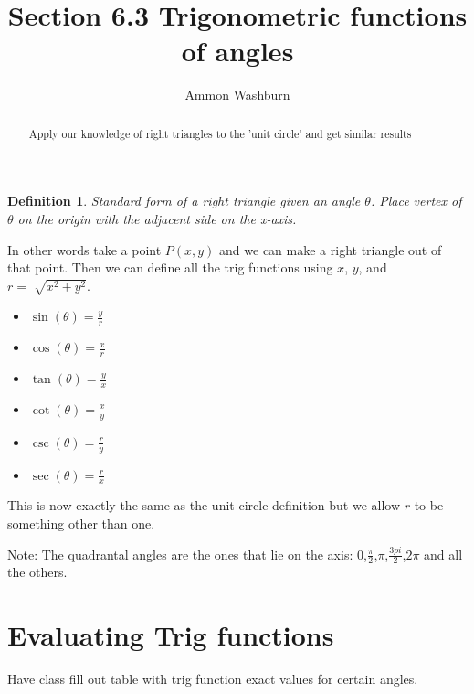 \documentclass{tufte-handout}
\title{Section 6.3 Trigonometric functions of angles}
\author[AW]{Ammon Washburn}
\newtheorem{mydef}{Definition}
\begin{document}
\maketitle

\begin{abstract}
Apply our knowledge of right triangles to the 'unit circle' and get similar results
\end{abstract}

\begin{mydef}
Standard form of a right triangle given an angle $\theta$.  Place vertex of $\theta$ on the origin with the adjacent side on the x-axis.
\end{mydef}

In other words take a point $P(x,y)$ and we can make a right triangle out of that point.  Then we can define all the trig functions using $x$, $y$, and $r = \sqrt[]{x^2 + y^2}$.

\begin{multicols}{3}
\begin{itemize}
\item $\sin(\theta) = \frac{y}{r}$
\item $\cos(\theta) = \frac{x}{r}$
\item $\tan(\theta) = \frac{y}{x}$
\item $\cot(\theta) = \frac{x}{y}$
\item $\csc(\theta) = \frac{r}{y}$
\item $\sec(\theta) = \frac{r}{x}$
\end{itemize}
\end{multicols}

This is now exactly the same as the unit circle definition but we allow $r$ to be something other than one.

Note: The quadrantal angles are the ones that lie on the axis: $0$,$\frac{\pi}{2}$,$\pi$,$\frac{3pi}{2}$,$2\pi$ and all the others.

\section{Evaluating Trig functions}

Have class fill out table with trig function exact values for certain angles.
\end{document}
